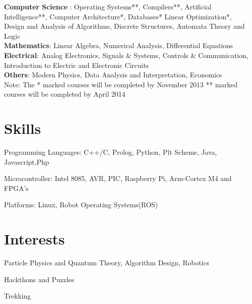 \documentclass[margin,11pt]{resume}
\begin{document}
\begin{resume}
\textbf{Computer Science} :
Operating Systems**, Compilers**, Artificial Intelligence**, 
Computer Architecture*, Databases*
Linear Optimization*, 
Design and Analysis of Algorithms, 
Discrete Structures, 
Automata Theory and Logic\\       
\textbf{Mathematics}: Linear Algebra, Numerical Analysis, Differential Equations\\
\textbf{Electrical}: Analog Electronics, Signals \& Systems, Controls \& Communication, Introduction to Electric and Electronic Circuits\\
\textbf{Others}: Modern Physics, Data Analysis and Interpretation, Economics
\\Note: The * marked courses will be completed by November 2013 ** marked courses will be completed by April 2014

\vspace{-1mm}
\section{\mysidestyle Skills}
\begin{list2}
\item Programming Languages: C++/C, Prolog, Python, Plt Scheme, Java, Javascript,Php
\item Microcontroller: Intel 8085, AVR, PIC, Raspberry Pi, Arm-Cortex M4 and  FPGA's
\item Platforms: Linux, Robot Operating Systems(ROS)
\end{list2}	
\section{\mysidestyle Interests} 
\begin{list2}
\item Particle Physics and Quantum Theory, Algorithm Design, Robotics
\item Hackthons and Puzzles
\item Trekking 				
\end{list2}

\end{resume}
\end{document}
